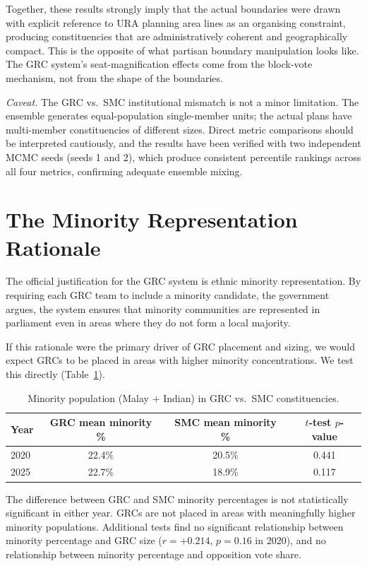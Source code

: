 \documentclass[12pt]{article}
\begin{document}
Together, these results strongly imply that the actual boundaries were drawn with explicit
reference to URA planning area lines as an organising constraint, producing constituencies that are
administratively coherent and geographically compact. This is the opposite of what partisan
boundary manipulation looks like. The GRC system's seat-magnification effects come from the
block-vote mechanism, not from the shape of the boundaries.

\medskip
\noindent\textit{Caveat.} The GRC vs.\ SMC institutional mismatch is not a minor limitation. The
ensemble generates equal-population single-member units; the actual plans have multi-member
constituencies of different sizes. Direct metric comparisons should be interpreted cautiously, and
the results have been verified with two independent MCMC seeds (seeds 1 and 2), which produce
consistent percentile rankings across all four metrics, confirming adequate ensemble mixing.

\section{The Minority Representation Rationale}

The official justification for the GRC system is ethnic minority representation. By requiring each
GRC team to include a minority candidate, the government argues, the system ensures that minority
communities are represented in parliament even in areas where they do not form a local majority.

If this rationale were the primary driver of GRC placement and sizing, we would expect GRCs to be
placed in areas with higher minority concentrations. We test this directly (Table~\ref{tab:minority}).

\begin{table}[h]
\centering
\caption{Minority population (Malay $+$ Indian) in GRC vs.\ SMC constituencies.}
\label{tab:minority}
\begin{tabular}{lccc}
\toprule
Year & GRC mean minority \% & SMC mean minority \% & $t$-test $p$-value \\
\midrule
2020 & 22.4\% & 20.5\% & 0.441 \\
2025 & 22.7\% & 18.9\% & 0.117 \\
\bottomrule
\end{tabular}
\end{table}

The difference between GRC and SMC minority percentages is not statistically significant in either
year. GRCs are not placed in areas with meaningfully higher minority populations. Additional tests
find no significant relationship between minority percentage and GRC size ($r = +0.214$, $p =
0.16$ in 2020), and no relationship between minority percentage and opposition vote share.
\end{document}
